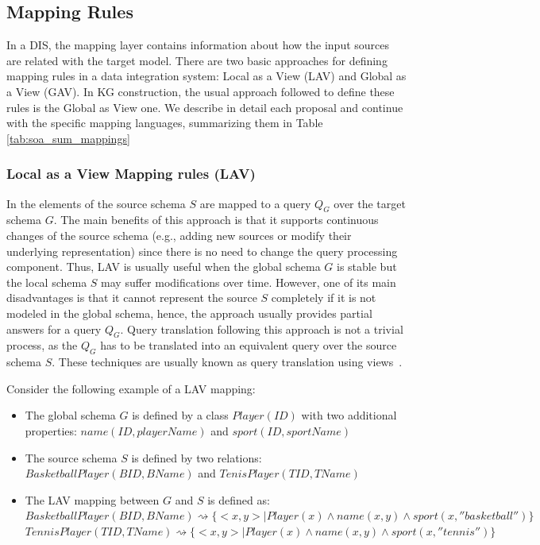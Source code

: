 \subsection{Mapping Rules}
In a DIS, the mapping layer contains information about how the input sources are related with the target model. There are two basic approaches for defining mapping rules in a data integration system: Local as a View (LAV) and Global as a View (GAV). In KG construction, the usual approach followed to define these rules is the Global as View one. We describe in detail each proposal and continue with the specific mapping languages, summarizing them in Table \ref{tab:soa_sum_mappings}

\subsubsection{Local as a View Mapping rules (LAV)}
In \citep{ullman1997information} the elements of the source schema $S$ are mapped  to a query $Q_G$ over the target schema $G$. The main benefits of this approach is that it supports continuous changes of the source schema (e.g., adding new sources or modify their underlying representation) since there is no need to change the query processing component. Thus, LAV is usually useful when the global schema $G$ is stable but the local schema $S$ may suffer modifications over time. However, one of its main disadvantages is that it cannot represent the source $S$ completely if it is not modeled in the global schema, hence, the approach usually provides partial answers for a query $Q_G$. Query translation following this approach is not a trivial process, as the $Q_G$ has to be translated into an equivalent query over the source schema $S$. These techniques are usually known as query translation using views~\citep{halevy2001answering}.

Consider the following example of a LAV mapping:
\begin{itemize}
    \item The global schema $G$ is defined by a class $Player(ID)$ with two additional properties: $name(ID, playerName)$ and $sport(ID,sportName)$
    \item The source schema $S$ is defined by two relations: $BasketballPlayer (BID, BName)$ and $TenisPlayer (TID, TName)$
    \item The LAV mapping between $G$ and $S$ is defined as:\\
    $BasketballPlayer(BID,BName) \rightsquigarrow \{<x,y>|Player(x)\wedge name(x,y) \wedge sport(x,''basketball'')\}$\\
    $TennisPlayer(TID,TName) \rightsquigarrow \{<x,y>|Player(x)\wedge name(x,y) \wedge sport(x,''tennis'')\}$
\end{itemize}

